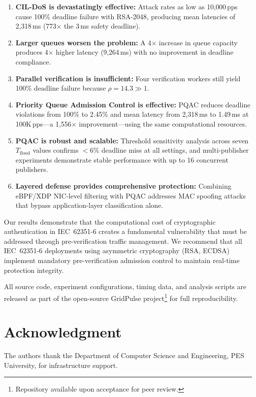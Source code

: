 \documentclass[journal]{IEEEtran}
\begin{document}
\begin{enumerate}[leftmargin=*]
    \item \textbf{CIL-DoS is devastatingly effective:} Attack rates as low as 10,000\,pps cause 100\% deadline failure with RSA-2048, producing mean latencies of 2,318\,ms (773$\times$ the 3\,ms safety deadline).
    \item \textbf{Larger queues worsen the problem:} A 4$\times$ increase in queue capacity produces 4$\times$ higher latency (9,264\,ms) with no improvement in deadline compliance.
    \item \textbf{Parallel verification is insufficient:} Four verification workers still yield 100\% deadline failure because $\rho = 14.3 \gg 1$.
    \item \textbf{Priority Queue Admission Control is effective:} PQAC reduces deadline violations from 100\% to 2.45\% and mean latency from 2,318\,ms to 1.49\,ms at 100K\,pps---a 1,556$\times$ improvement---using the same computational resources.
    \item \textbf{PQAC is robust and scalable:} Threshold sensitivity analysis across seven $T_{\text{flood}}$ values confirms $<$6\% deadline miss at all settings, and multi-publisher experiments demonstrate stable performance with up to 16 concurrent publishers.
    \item \textbf{Layered defense provides comprehensive protection:} Combining eBPF/XDP NIC-level filtering with PQAC addresses MAC spoofing attacks that bypass application-layer classification alone.
\end{enumerate}

Our results demonstrate that the computational cost of cryptographic authentication in IEC~62351-6 creates a fundamental vulnerability that must be addressed through pre-verification traffic management. We recommend that all IEC~62351-6 deployments using asymmetric cryptography (RSA, ECDSA) implement mandatory pre-verification admission control to maintain real-time protection integrity.

All source code, experiment configurations, timing data, and analysis scripts are released as part of the open-source GridPulse project\footnote{Repository available upon acceptance for peer review.} for full reproducibility.

\section*{Acknowledgment}
The authors thank the Department of Computer Science and Engineering, PES University, for infrastructure support.



\end{document}
